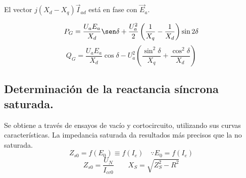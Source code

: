 			
			El vector $j(X_d - X_q)\vec I_{ad}$ está en fase con $\vec E_a$.
			
			\[P_G = \dfrac{U_a E_a}{X_d} \sen \delta + \dfrac{U_a^2}{2}\left(\dfrac{1}{X_q} - \dfrac{1}{X_d}\right)\sin 2\delta\]
			\[Q_G = \dfrac{U_a E_a}{X_d} \cos \delta - U_a^2\left(\dfrac{\sin^2 \delta}{X_q} + \dfrac{\cos^2 \delta}{X_d}\right)\]
			
		\subsection{Determinación de la reactancia síncrona saturada.}
			Se obtiene a través de ensayos de vacío y cortocircuito, utilizando sus curvas características. La impedancia saturada da resultados más precisos que la no saturada.
			\[Z_{s0} = f(E_0)\equiv f(I_e) \quad \because E_0 = f(I_e)\]
			\[Z_{s0} = \dfrac{U_N}{I_{cc0}}\qquad X_S = \sqrt{Z_S^2 - R^2}\]
			
